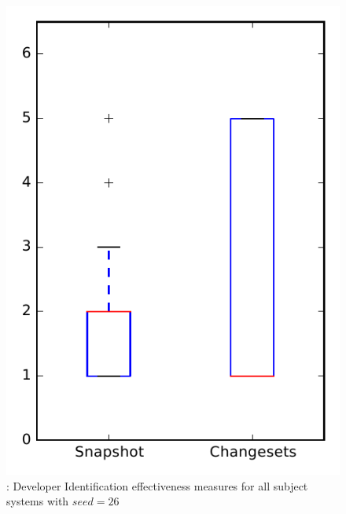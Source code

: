 
\begin{figure}
\centering
\includegraphics[height=0.4\textheight]{figures/dit_seed/rq1_overview_26}
\caption{\rtwo: Developer Identification effectiveness measures for all subject systems with $seed=26$}
\label{fig:dit_seed:rq1:overview}
\end{figure}

